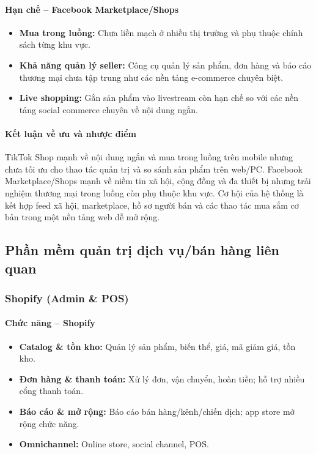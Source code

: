 \paragraph{Hạn chế – Facebook Marketplace/Shops}
\begin{itemize}
    \item \textbf{Mua trong luồng:} Chưa liền mạch ở nhiều thị trường và phụ thuộc chính sách từng khu vực.
    \item \textbf{Khả năng quản lý seller:} Công cụ quản lý sản phẩm, đơn hàng và báo cáo thương mại chưa tập trung như các nền tảng e-commerce chuyên biệt.
    \item \textbf{Live shopping:} Gắn sản phẩm vào livestream còn hạn chế so với các nền tảng social commerce chuyên về nội dung ngắn.
\end{itemize}

\paragraph{Kết luận về ưu và nhược điểm}
TikTok Shop mạnh về nội dung ngắn và mua trong luồng trên mobile nhưng chưa tối ưu cho thao tác quản trị và so sánh sản phẩm trên web/PC. Facebook Marketplace/Shops mạnh về niềm tin xã hội, cộng đồng và đa thiết bị nhưng trải nghiệm thương mại trong luồng còn phụ thuộc khu vực. Cơ hội của hệ thống là kết hợp feed xã hội, marketplace, hồ sơ người bán và các thao tác mua sắm cơ bản trong một nền tảng web dễ mở rộng.

\subsection{Phần mềm quản trị dịch vụ/bán hàng liên quan}

\subsubsection{Shopify (Admin \& POS)}
\paragraph{Chức năng – Shopify}
\begin{itemize}
    \item \textbf{Catalog \& tồn kho:} Quản lý sản phẩm, biến thể, giá, mã giảm giá, tồn kho.
    \item \textbf{Đơn hàng \& thanh toán:} Xử lý đơn, vận chuyển, hoàn tiền; hỗ trợ nhiều cổng thanh toán.
    \item \textbf{Báo cáo \& mở rộng:} Báo cáo bán hàng/kênh/chiến dịch; app store mở rộng chức năng.
    \item \textbf{Omnichannel:} Online store, social channel, POS.
\end{itemize}

